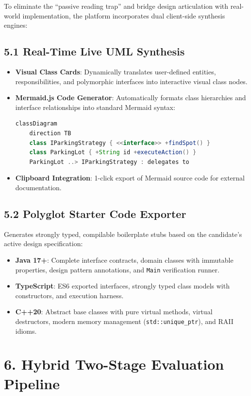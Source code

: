 \documentclass[10pt,a4paper]{article}
\begin{document}
To eliminate the ``passive reading trap'' and bridge design articulation with real-world implementation, the platform incorporates dual client-side synthesis engines:

\subsection{5.1 Real-Time Live UML Synthesis}
\begin{itemize}
  \item \textbf{Visual Class Cards}: Dynamically translates user-defined entities, responsibilities, and polymorphic interfaces into interactive visual class nodes.
  \item \textbf{Mermaid.js Code Generator}: Automatically formats class hierarchies and interface relationships into standard Mermaid syntax:
\begin{lstlisting}[language=java]
classDiagram
    direction TB
    class IParkingStrategy { <<interface>> +findSpot() }
    class ParkingLot { +String id +executeAction() }
    ParkingLot ..> IParkingStrategy : delegates to
\end{lstlisting}
  \item \textbf{Clipboard Integration}: 1-click export of Mermaid source code for external documentation.
\end{itemize}

\subsection{5.2 Polyglot Starter Code Exporter}
Generates strongly typed, compilable boilerplate stubs based on the candidate's active design specification:
\begin{itemize}
  \item \textbf{Java 17+}: Complete interface contracts, domain classes with immutable properties, design pattern annotations, and \texttt{Main} verification runner.
  \item \textbf{TypeScript}: ES6 exported interfaces, strongly typed class models with constructors, and execution harness.
  \item \textbf{C++20}: Abstract base classes with pure virtual methods, virtual destructors, modern memory management (\texttt{std::unique\_ptr}), and RAII idioms.
\end{itemize}

\section{6. Hybrid Two-Stage Evaluation Pipeline}
\end{document}
